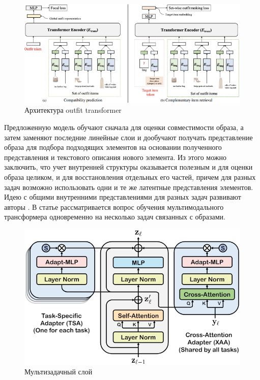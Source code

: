 \documentclass[a4paper,14pt]{extarticle}
\begin{document}
				\begin{figure}[h!]
					\includegraphics[scale = 0.8]{pictures/OutfitTransfromer intro.png}
					\caption{Архитектура outfit transformer}
				\end{figure}
				Предложенную модель обучают сначала для оценки совместимости образа, а затем заменяют последние линейные слои и дообучают получать представление образа для подбора подходящих элементов на основании полученного представления и текстового описания нового элемента. Из этого можно заключить, что учет внутренней структуры оказывается полезным и для оценки образа целиком, и для восстановления отдельных его частей, причем для разных задач возможно использовать одни и те же латентные представления элементов. \\
				
				Идею с общими внутренними представлениями для разных задач развивают авторы \cite{https://doi.org/10.48550/arXiv.2303.02483}. В статье рассматривается вопрос обучения мультимодального трансформера одновременно на несколько задач связанных с образами. 
				\vspace{-0.5cm}
				\begin{figure}
					\includegraphics[scale = 0.55]{pictures/FAME-ViL_acrhitecture.png}
					\caption{Мультизадачный слой}
				\end{figure}
			
\end{document}
